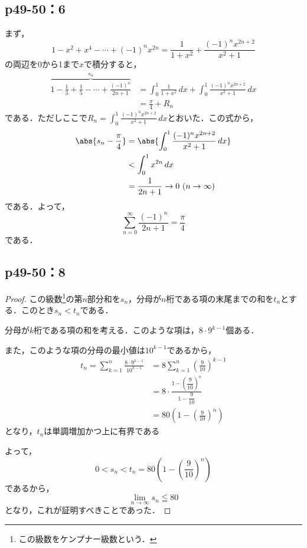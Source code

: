 \documentclass[a4paper,10pt,fleqn]{ltjsarticle}
\begin{document}
    \subsection*{p49-50：6}
    \begin{tleftbar}
        まず，
        \[
             1-x^2+x^4-\cdots+(-1)^n x^{2n} =\frac{1}{1+x^2} +\frac{(-1)^n x^{2n+2}}{x^2+1}
        \]
    の両辺を0から1まで$x$で積分すると，
    \begin{align*}
       \overbrace{1-\frac{1}{3}+\frac{1}{5}-\cdots+\frac{(-1)^n}{2n+1}}^{s_n} &=\int_{0}^{1} \frac{1}{1+x^2} \, dx +\int_{0}^{1}\frac{(-1)^n x^{2n+2}}{x^2+1}  \, dx \\
    & = \frac{\pi}{4} + R_n
    \end{align*}
    である．ただしここで$R_n =\int_{0}^{1}\frac{(-1)^n x^{2n+2}}{x^2+1} \, dx$とおいた．この式から，
    \begin{align*}
      \abs{s_n -\frac{\pi}{4}  } & = \abs{\int_{0}^{1}\frac{(-1)^n x^{2n+2}}{x^2+1} \, dx } \\
       & < \int_{0}^{1} x^{2n} \, dx \\
       & =\frac{1}{2n+1} \to 0 ~(n \to \infty)
    \end{align*}
    である．よって，
    \[
        \sum_{n=0}^{\infty} \frac{(-1)^n}{2n+1} =\frac{\pi}{4}
    \]
    である．
    \end{tleftbar}

    \newpage 

    \subsection*{p49-50：8}

    \begin{tleftbar}
        \begin{proof}
        この級数\footnote{この級数をケンプナー級数という．}の第$n$部分和を$s_n$，分母が$n$桁である項の末尾までの和を$t_n$とする．このとき$s_n < t_n$である．

        分母が$k$桁である項の和を考える．このような項は，$8 \cdot 9^{k-1}$個ある．
        
        また，このような項の分母の最小値は$10^{k-1}$であるから，
        \begin{align*} 
            t_n = \sum_{k=1}^{n} \frac{8 \cdot 9^{k-1}}{10^{k-1}} &= 8 \sum_{k=1}^{n} \left(\frac{9}{10}\right)^{k-1} \\
            &= 8 \cdot \frac{1-\left(\dfrac{9}{10}\right)^n}{1-\dfrac{9}{10}} \\
            & = 80 \left(1-\left(\frac{9}{10}\right)^n\right)
        \end{align*}
        となり，$t_n$は単調増加かつ上に有界である

        よって，
        \[
            0 < s_n < t_n = 80 \left(1-\left(\frac{9}{10}\right)^n\right)
        \]
        であるから，
        \[
            \lim_{n \to \infty} s_n \leqq 80
        \]
        となり，これが証明すべきことであった．
    \end{proof}
\end{tleftbar}
\end{document}

